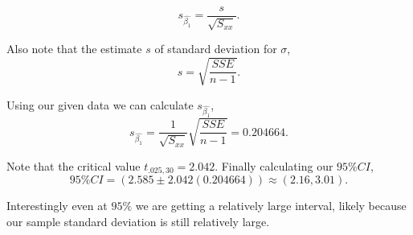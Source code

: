 \documentclass[12pt]{article}
\makeatletter
\theoremstyle{homework}
\newenvironment{exercise}[1]
{\def\@currentlabel{#1}\exercisecore}
{\endexercisecore}
\makeatother
\begin{document}
\begin{exercise}{12.46}
\begin{enumerate}
    \begin{equation*}
      s_{\hat{\beta_1}} = \dfrac{s}{\sqrt{S_{xx}}}.
    \end{equation*}
    
    Also note that the estimate $s$ of standard deviation for $\sigma$,\
    \begin{equation*}
      s = \sqrt{\dfrac{SSE}{n-1}}.
    \end{equation*}
    
    Using our given data we can calculate $s_{\hat{\beta_1}}$,
    \begin{equation*}
      s_{\hat{\beta_1}} = \dfrac{1}{\sqrt{S_{xx}}}\sqrt{\dfrac{SSE}{n-1}} = 0.204664.
    \end{equation*}
    
    Note that the critical value $t_{.025, 30} = 2.042$. Finally calculating our $95\% CI$,
    \begin{equation*}
      95\% CI = (2.585 \pm 2.042(0.204664)) \approx (2.16, 3.01).
    \end{equation*}

    Interestingly even at $95\%$ we are getting a relatively large interval, likely because our sample standard deviation is still relatively large.
  
  
  
  \end{enumerate}
\end{exercise}
\vspace{.5in}
\end{document}
